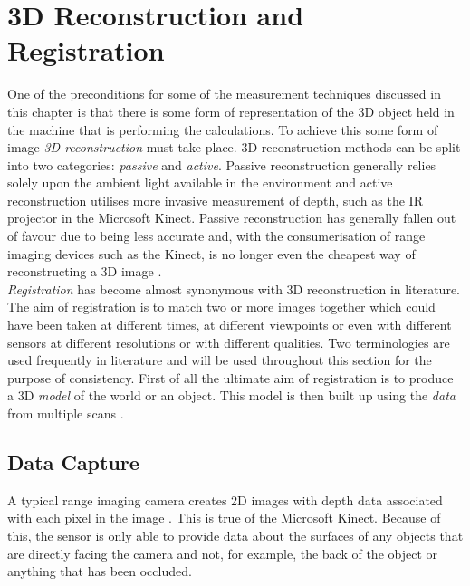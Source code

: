 \section{3D Reconstruction and Registration}
\label{research:registration}
\label{research:reconstruction}

One of the preconditions for some of the measurement techniques discussed in this chapter is that there is some form of representation of the 3D object held in the machine that is performing the calculations. To achieve this some form of image \emph{3D reconstruction} must take place. 3D reconstruction methods can be split into two categories: \emph{passive} and \emph{active}. Passive reconstruction generally relies solely upon the ambient light available in the environment and active reconstruction utilises more invasive measurement of depth, such as the IR projector in the Microsoft Kinect. Passive reconstruction has generally fallen out of favour due to being less accurate and, with the consumerisation of range imaging devices such as the Kinect, is no longer even the cheapest way of reconstructing a 3D image \cite{ide2012}. \\

\emph{Registration} has become almost synonymous with 3D reconstruction in literature. The aim of registration is to match two or more images together which could have been taken at different times, at different viewpoints or even with different sensors at different resolutions or with different qualities. Two terminologies are used frequently in literature and will be used throughout this section for the purpose of consistency. First of all the ultimate aim of registration is to produce a 3D \emph{model} of the world or an object. This model is then built up using the \emph{data} from multiple scans \cite{besl92}. \\

\subsection{Data Capture} 
A typical range imaging camera creates 2D images with depth data associated with each pixel in the image \cite{stamos2000}. This is true of the Microsoft Kinect. Because of this, the sensor is only able to provide data about the surfaces of any objects that are directly facing the camera and not, for example, the back of the object or anything that has been occluded. \\

